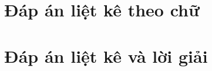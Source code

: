 \documentclass[12pt]{article}
\newenvironment{khung}{%
  \def\FrameCommand{\fcolorbox{black}{shadecolor}}%
  \MakeFramed {\advance\hsize-\width \FrameRestore}%
  }%
{\endMakeFramed}
\def\dkhung{
\begin{khung}
\noindent\theverbbox[t]
\end{khung}
}
\begin{document}
\begin{verbbox}
\thispagestyle{empty}
\indapanso
\begin{center}
\begin{multicols}{10}
\begin{enumerate}[\socau]
\foreachproblem[bttracnghiem]{\item\thisproblem}
\end{enumerate}
\end{multicols}
\end{center}
\end{verbbox}
\dkhung

\thispagestyle{empty}
\indapanso
\begin{center}
\begin{multicols}{10}
\begin{enumerate}[\socau]
\foreachproblem[bttracnghiem]{\item\thisproblem}
\end{enumerate}
\end{multicols}
\end{center}

\newpage
\section{Đáp án liệt kê theo chữ}

\begin{verbbox} 
 \indapanchu
\thispagestyle{empty}
\begin{center}
\begin{multicols}{10}
\begin{enumerate}[]
\foreachproblem[bttracnghiem]{\item\thisproblem}
\end{enumerate}
\end{multicols}
\end{center}
\end{verbbox} 
\dkhung
 

\indapanchu
\thispagestyle{empty}
\begin{center}
\begin{multicols}{10}
\begin{enumerate}[ ]
\foreachproblem[bttracnghiem]{\item\thisproblem}
\end{enumerate}
\end{multicols}
\end{center}

\newpage
\section{Đáp án liệt kê và lời giải}
\end{document}
